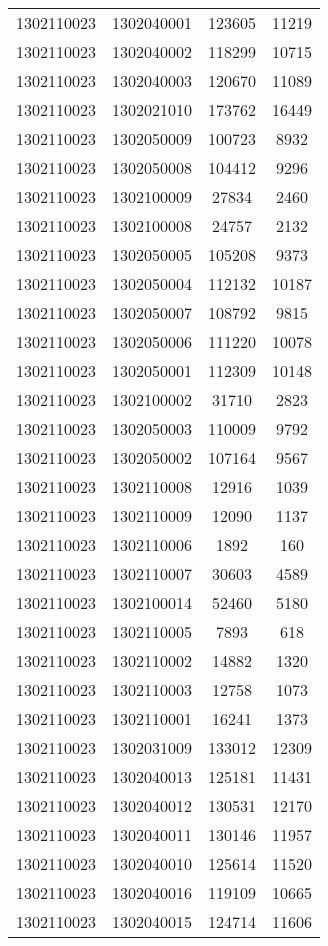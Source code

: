 \begin{longtable}{llcc}
1302110023 & 1302040001 & 123605 & 11219\\
1302110023 & 1302040002 & 118299 & 10715\\
1302110023 & 1302040003 & 120670 & 11089\\
1302110023 & 1302021010 & 173762 & 16449\\
1302110023 & 1302050009 & 100723 & 8932\\
1302110023 & 1302050008 & 104412 & 9296\\
1302110023 & 1302100009 & 27834 & 2460\\
1302110023 & 1302100008 & 24757 & 2132\\
1302110023 & 1302050005 & 105208 & 9373\\
1302110023 & 1302050004 & 112132 & 10187\\
1302110023 & 1302050007 & 108792 & 9815\\
1302110023 & 1302050006 & 111220 & 10078\\
1302110023 & 1302050001 & 112309 & 10148\\
1302110023 & 1302100002 & 31710 & 2823\\
1302110023 & 1302050003 & 110009 & 9792\\
1302110023 & 1302050002 & 107164 & 9567\\
1302110023 & 1302110008 & 12916 & 1039\\
1302110023 & 1302110009 & 12090 & 1137\\
1302110023 & 1302110006 & 1892 & 160\\
1302110023 & 1302110007 & 30603 & 4589\\
1302110023 & 1302100014 & 52460 & 5180\\
1302110023 & 1302110005 & 7893 & 618\\
1302110023 & 1302110002 & 14882 & 1320\\
1302110023 & 1302110003 & 12758 & 1073\\
1302110023 & 1302110001 & 16241 & 1373\\
1302110023 & 1302031009 & 133012 & 12309\\
1302110023 & 1302040013 & 125181 & 11431\\
1302110023 & 1302040012 & 130531 & 12170\\
1302110023 & 1302040011 & 130146 & 11957\\
1302110023 & 1302040010 & 125614 & 11520\\
1302110023 & 1302040016 & 119109 & 10665\\
1302110023 & 1302040015 & 124714 & 11606\\

\end{longtable}
